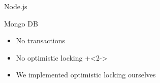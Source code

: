 \begin{frame}[fragile]{Node.js}
\hfill 

\begin{tiny}
\end{tiny}

\end{frame}

\begin{frame}[fragile]{Mongo DB}

\begin{itemize}
\item No transactions
\item No optimistic locking
\onslide+<2->
\item We implemented optimistic locking ourselves
\end{itemize}

\end{frame}

